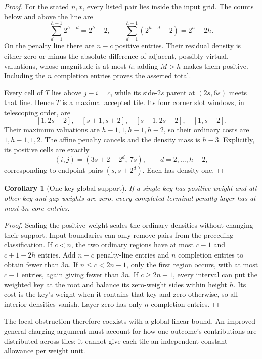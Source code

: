 \documentclass[11pt]{article}
\newtheorem{corollary}[theorem]{Corollary}
\begin{document}
\begin{proof}
For the stated $n,x$, every listed pair lies inside the input grid.
The counts below and above the line are
\[
 \sum_{d=1}^{h-1}2^{h-d}=2^h-2,\qquad
 \sum_{d=1}^{h-1}(2^{h-d}-2)=2^h-2h.
\]
On the penalty line there are $n-c$ positive entries. Their residual
density is either zero or minus the absolute difference of adjacent,
possibly virtual, valuations, whose magnitude is at most $h$; adding
$M>h$ makes them positive. Including the $n$ completion entries proves
the asserted total.

Every cell of $T$ lies above $j-i=c$, while its side-$2s$ parent at
$(2s,6s)$ meets that line. Hence $T$ is a maximal accepted tile.
Its four corner slot windows, in telescoping order, are
\[
 [1,2s+2],\quad[s+1,s+2],\quad[s+1,2s+2],\quad[1,s+2].
\]
Their maximum valuations are $h-1,1,h-1,h-2$, so their ordinary
costs are $1,h-1,1,2$. The affine penalty cancels and the density mass
is $h-3$. Explicitly, its positive cells are exactly
\[
 (i,j)=(3s+2-2^d,\ 7s),\qquad d=2,\ldots,h-2,
\]
corresponding to endpoint pairs $(s,s+2^d)$. Each has density one.
\end{proof}

\begin{corollary}[One-key global support]\label{cor:one-key-core}
If a single key has positive weight and all other key and gap weights
are zero, every completed terminal-penalty layer has at most $3n$
core entries.
\end{corollary}
\begin{proof}
Scaling the positive weight scales the ordinary densities without changing
their support. Input boundaries can only remove pairs from the preceding
classification. If $c<n$, the two ordinary regions have at most $c-1$
and $c+1-2h$ entries. Add $n-c$ penalty-line entries and $n$ completion
entries to obtain fewer than $3n$. If $n\le c<2n-1$, only the first
region occurs, with at most $c-1$ entries, again giving fewer than $3n$.
If $c\ge2n-1$, every interval can put the weighted key at the root and
balance its zero-weight sides within height $h$. Its cost is the key's
weight when it contains that key and zero otherwise, so all interior
densities vanish. Layer zero has only $n$ completion entries.
\end{proof}

The local obstruction therefore coexists with a global linear bound.
An improved general charging argument must account for how one outcome's
contributions are distributed across tiles; it cannot give each tile an
independent constant allowance per weight unit.
\end{document}
